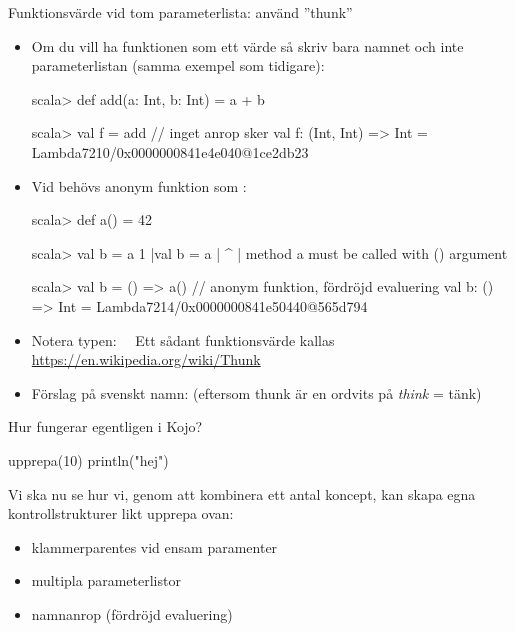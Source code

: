 \begin{Slide}{Funktionsvärde vid tom parameterlista: använd ''thunk''}\SlideFontSmall
\begin{itemize}\SlideFontTiny

\item Om du vill ha funktionen som ett värde så skriv bara namnet och inte parameterlistan (samma exempel som tidigare):
\begin{REPLsmall}
scala> def add(a: Int, b: Int) = a + b

scala> val f = add     // inget anrop sker 
val f: (Int, Int) => Int = Lambda7210/0x0000000841e4e040@1ce2db23
\end{REPLsmall}

\item Vid  behövs anonym funktion som : 
\begin{REPLsmall}
scala> def a() = 42

scala> val b = a
1 |val b = a
  |        ^
  |        method a must be called with () argument

scala> val b = () => a()   // anonym funktion, fördröjd evaluering
val b: () => Int = Lambda7214/0x0000000841e50440@565d794
\end{REPLsmall} \pause
\item Notera typen:  ~~Ett sådant funktionsvärde kallas \\ \url{https://en.wikipedia.org/wiki/Thunk} 
\item Förslag på svenskt namn:    (eftersom thunk är en ordvits på \emph{think} = tänk)
\end{itemize}
\end{Slide}




\begin{Slide}{Hur fungerar egentligen  i Kojo?}
\begin{Code}[basicstyle=\ttfamily\SlideFontSize{14}{16}]
upprepa(10) {
  println("hej")
}
\end{Code}

\pause
Vi ska nu se hur vi, genom att kombinera ett antal koncept, kan skapa egna kontrollstrukturer likt upprepa ovan:
\begin{itemize}
\item klammerparentes vid ensam paramenter
\item multipla parameterlistor
\item namnanrop (fördröjd evaluering)
\end{itemize}
\end{Slide}



